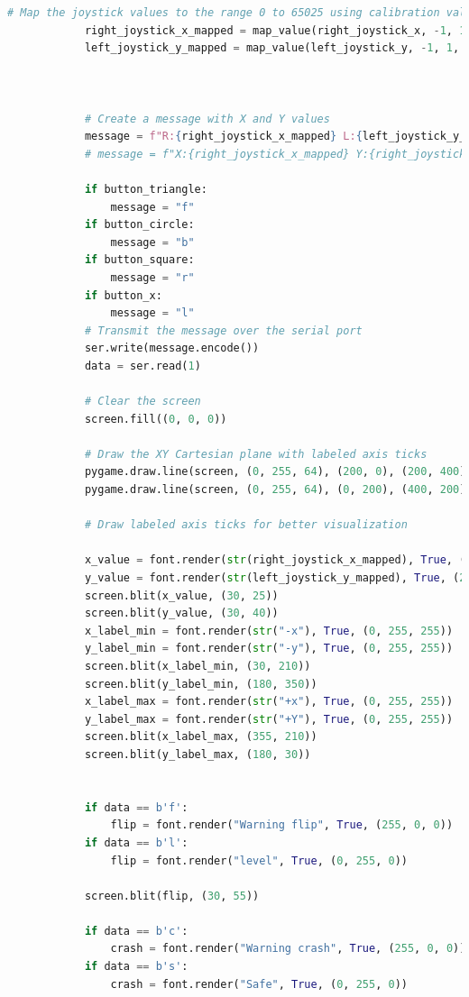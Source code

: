 \documentclass[conference]{IEEEtran}
\begin{document}
\begin{lstlisting}[language=Python, caption=RC Wheelchair Test Application, label=wheelchair_test_code]
            # Map the joystick values to the range 0 to 65025 using calibration values
            right_joystick_x_mapped = map_value(right_joystick_x, -1, 1, 65535, 0)
            left_joystick_y_mapped = map_value(left_joystick_y, -1, 1, 65535, 0)



            # Create a message with X and Y values
            message = f"R:{right_joystick_x_mapped} L:{left_joystick_y_mapped}\n\r"
            # message = f"X:{right_joystick_x_mapped} Y:{right_joystick_y_mapped}"

            if button_triangle:
                message = "f"
            if button_circle:
                message = "b"
            if button_square:
                message = "r"
            if button_x:
                message = "l"
            # Transmit the message over the serial port
            ser.write(message.encode())
            data = ser.read(1)

            # Clear the screen
            screen.fill((0, 0, 0))

            # Draw the XY Cartesian plane with labeled axis ticks
            pygame.draw.line(screen, (0, 255, 64), (200, 0), (200, 400), 2)  # Y-axis
            pygame.draw.line(screen, (0, 255, 64), (0, 200), (400, 200), 2)  # X-axis

            # Draw labeled axis ticks for better visualization

            x_value = font.render(str(right_joystick_x_mapped), True, (255, 0, 0))
            y_value = font.render(str(left_joystick_y_mapped), True, (255, 0, 0))
            screen.blit(x_value, (30, 25))
            screen.blit(y_value, (30, 40))
            x_label_min = font.render(str("-x"), True, (0, 255, 255))
            y_label_min = font.render(str("-y"), True, (0, 255, 255))
            screen.blit(x_label_min, (30, 210))
            screen.blit(y_label_min, (180, 350))
            x_label_max = font.render(str("+x"), True, (0, 255, 255))
            y_label_max = font.render(str("+Y"), True, (0, 255, 255))
            screen.blit(x_label_max, (355, 210))
            screen.blit(y_label_max, (180, 30))


            if data == b'f':
                flip = font.render("Warning flip", True, (255, 0, 0))
            if data == b'l':
                flip = font.render("level", True, (0, 255, 0))

            screen.blit(flip, (30, 55))

            if data == b'c':
                crash = font.render("Warning crash", True, (255, 0, 0))
            if data == b's':
                crash = font.render("Safe", True, (0, 255, 0))


\end{lstlisting}
\end{document}
